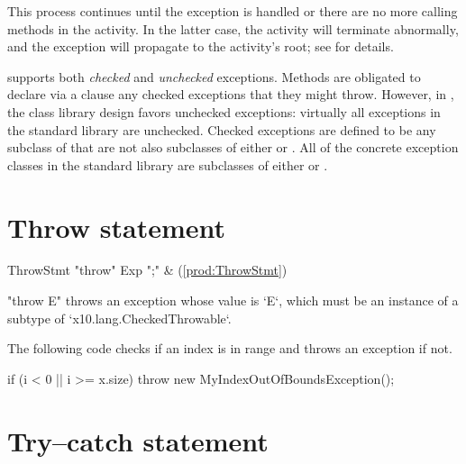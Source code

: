 This process continues until the exception is handled or there are no more
calling methods in the activity. In the latter case, the activity will
terminate abnormally, and the exception will propagate to the activity's root;
see  for details.

\Xten{} supports both {\em checked} and {\em unchecked}
exceptions. Methods are obligated to declare via a  clause
any checked exceptions that they might throw.  However, in 
\Xten{}, the class library design favors unchecked exceptions:
virtually all exceptions in the standard library are unchecked.  Checked
exceptions are defined to be any subclass of
 that are not also subclasses of
either  or . All of the
concrete exception classes in the \Xten{} standard library are
subclasses of either  or .


\section{Throw statement}

\begin{bbgrammar}
           ThrowStmt \: \xcd"throw" Exp \xcd";" & (\ref{prod:ThrowStmt}) \\
\end{bbgrammar}

\xcd"throw E" throws an exception whose value is \xcd`E`, which must be an
instance of a subtype of \xcd`x10.lang.CheckedThrowable`. 

\begin{ex}
The following code checks if an index is in range and
throws an exception if not.

\begin{xten}
if (i < 0 || i >= x.size)
    throw new MyIndexOutOfBoundsException();
\end{xten}
\end{ex}

\section{Try--catch statement}

